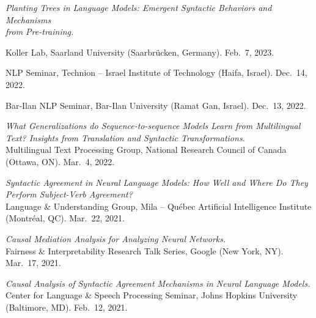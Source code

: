 \documentclass[10pt]{article}
\renewcommand{\section}[1]{\pagebreak[3]%
	\vspace{0.5\baselineskip}%
	\phantomsection\addcontentsline{toc}{section}{#1}%
	\noindent\llap{\bf\scshape\smash{\parbox[t]{\marginparwidth}{\hyphenpenalty=10000\raggedright \textcolor{black}{#1}}}}%
	\vspace{-\baselineskip}\par}
\newcommand{\halfblankline}{\quad\vspace{-0.5\baselineskip}\pagebreak[3]}
\begin{document}
	\halfblankline

	\emph{Planting Trees in Language Models: Emergent Syntactic Behaviors and Mechanisms\\from Pre-training.}
	\begin{innerlist}
	\item Koller Lab, Saarland University (Saarbrücken, Germany). Feb.\ 7, 2023.
	\item NLP Seminar, Technion -- Israel Institute of Technology (Haifa, Israel). Dec.\ 14, 2022.
	\item Bar-Ilan NLP Seminar, Bar-Ilan University (Ramat Gan, Israel). Dec.\ 13, 2022.
	\end{innerlist}

	\halfblankline

	\emph{What Generalizations do Sequence-to-sequence Models Learn from Multilingual Text? Insights from Translation and Syntactic Transformations.}\\Multilingual Text Processing Group, National Research Council of Canada (Ottawa, ON). Mar.\ 4, 2022.
	
	\halfblankline

	\emph{Syntactic Agreement in Neural Language Models: How Well and Where Do They Perform Subject-Verb Agreement?}\\Language \& Understanding Group, Mila -- Québec Artificial Intelligence Institute (Montréal, QC). Mar.\ 22, 2021.
	
	\halfblankline

	\emph{Causal Mediation Analysis for Analyzing Neural Networks.}\\Fairness \& Interpretability Research Talk Series, Google (New York, NY). Mar.\ 17, 2021.
	
	\halfblankline

	\emph{Causal Analysis of Syntactic Agreement Mechanisms in Neural Language Models.}\\Center for Language \& Speech Processing Seminar, Johns Hopkins University (Baltimore, MD). Feb.\ 12, 2021.
	
	\halfblankline


\end{document}
